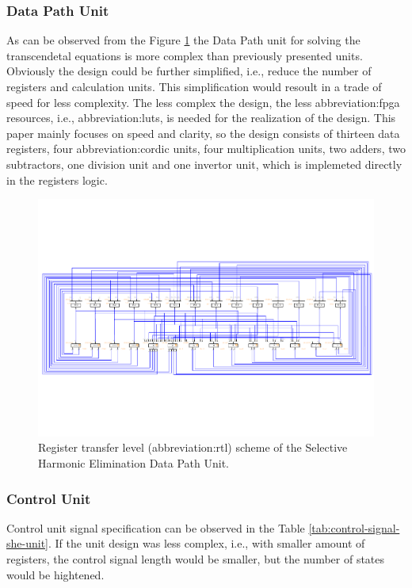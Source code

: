 \documentclass[a4paper, twoside, 11pt]{article}
\begin{document}
        \subsubsection{Data Path Unit}\label{sh:data-path-unit}
            As can be observed from the Figure \ref{fig:she-rtl} the Data Path unit for solving the transcendetal equations is more complex than previously presented units. Obviously the design could be further simplified, i.e., reduce the number of registers and calculation units. This simplification would resoult in a trade of speed for less complexity. The less complex the design, the less \gls{abbreviation:fpga} resources, i.e., \gls{abbreviation:lut}s, is needed for the realization of the design. This paper mainly focuses on speed and clarity, so the design consists of thirteen data registers, four \gls{abbreviation:cordic} units, four multiplication units, two adders, two subtractors, one division unit and one invertor unit, which is implemeted directly in the registers logic.
            \begin{figure}[htbp!]
                \centering
                \includegraphics[width=1\textwidth]{src/pdf/she-rtl.pdf}
                \caption{Register transfer level (\gls{abbreviation:rtl}) scheme of the Selective Harmonic Elimination Data Path Unit.}
                \label{fig:she-rtl}
            \end{figure}
    
    \FloatBarrier
        \subsubsection{Control Unit}\label{subsubsec:sh-elimination-control-unit}
            Control unit signal specification can be observed in the Table \ref{tab:control-signal-she-unit}. If the unit design was less complex, i.e., with smaller amount of registers, the control signal length would be smaller, but the number of states would be hightened.
\end{document}
